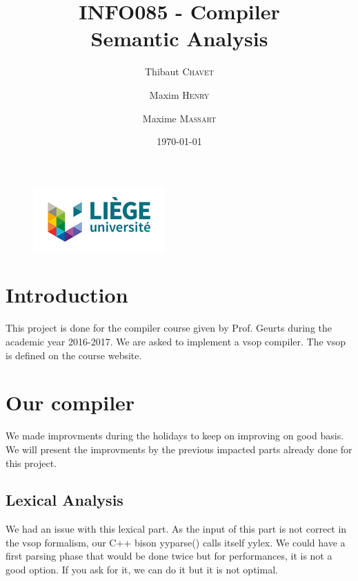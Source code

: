 \documentclass[a4paper,11pt]{article}
\title{INFO085 - Compiler \\ Semantic Analysis }
\date{\today}
\author{Thibaut \textsc{Chavet} \and Maxim \textsc{Henry} \and Maxime \textsc{Massart}}
\begin{document}
\begin{figure}
\begin{center}
\includegraphics[scale = 1.2]{logoulg}
\end{center}
\end{figure}

\maketitle
\thispagestyle{empty}
\setcounter{page}{0}

% 
% 
% 
% 
% 
% 

\section{Introduction}
This project is done for the compiler course given by Prof. Geurts during the academic year 2016-2017. 
We are asked to implement a vsop compiler. The vsop is defined on the course website.

\section{Our compiler}
We made improvments during the holidays to keep on improving on good basis. We will present the improvments
by the previous impacted parts already done for this project.

\subsection{Lexical Analysis}
We had an issue with this lexical part. As the input of this part is not correct in the vsop formalism,
our C++ bison yyparse() calls itself yylex. We could have a first parsing phase that would be done twice
but for performances, it is not a good option. If you ask for it, we can do it but it is not optimal.
\end{document}
